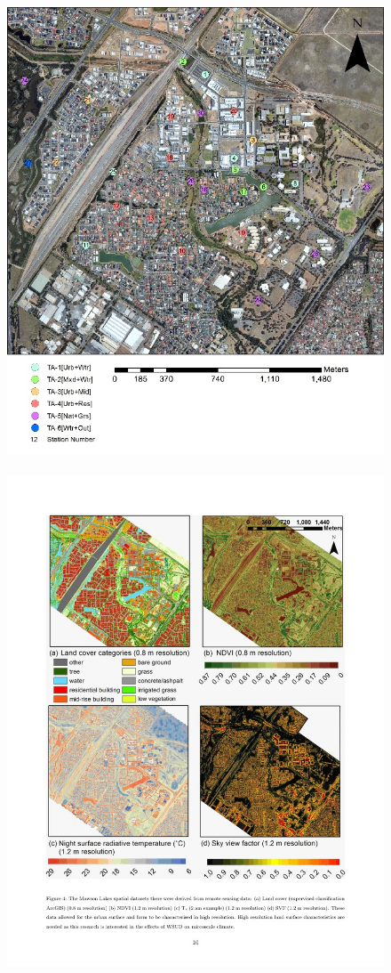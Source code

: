 \documentclass[final,3p,times,authoryear]{elsarticle}
\begin{document}
\begin{figure}[!htbp]
\includegraphics[trim=0mm 0mm 0mm 0mm, clip,scale=0.5]{images/Mawson1.jpg}
~
\includegraphics[trim=0mm 0mm 0mm 0mm, clip,scale=0.5]{images/Mawson2.png}

\end{figure}
\end{document}

